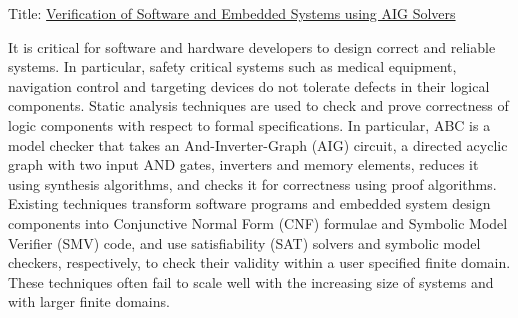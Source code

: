\clearpage

\thispagestyle{plain}
\setcounter{page}{6}
\quad \quad {}

\vspace{1.5cm}

\small{

\vspace{1.5cm}

\noindent Title: \underline{Verification of Software and Embedded Systems using AIG Solvers}

\vspace{1.5cm}

It is critical for software and hardware developers to design 
correct and reliable systems. In particular, safety critical 
systems such as medical equipment, navigation control and 
targeting devices do not tolerate defects in their logical 
components. 
Static analysis techniques are used to check and prove correctness 
of logic components with respect to formal specifications. 
In particular, ABC is a model checker that takes an And-Inverter-Graph (AIG) circuit,
a directed acyclic graph with two input AND gates, inverters and 
memory elements, 
reduces it using synthesis algorithms, and checks it for correctness
using proof algorithms. 
Existing techniques transform software programs
and embedded system design components into Conjunctive Normal Form (CNF)
formulae and Symbolic Model Verifier (SMV)
code, and use satisfiability (SAT) solvers and symbolic
model checkers, respectively, to check their validity 
within a user specified finite domain.
These techniques often fail to scale well with 
the increasing size of systems and with larger finite domains. 

}

